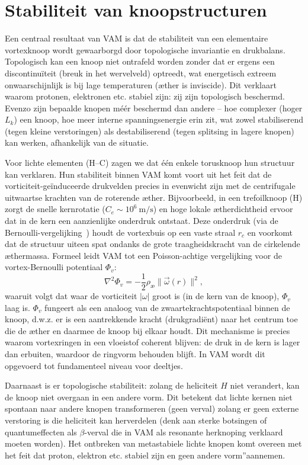 \section{Stabiliteit van knoopstructuren}

Een centraal resultaat van VAM is dat de stabiliteit van een elementaire vortexknoop wordt gewaarborgd door topologische invariantie en drukbalans. Topologisch kan een knoop niet ontrafeld worden zonder dat er ergens een discontinuïteit (breuk in het wervelveld) optreedt, wat energetisch extreem onwaarschijnlijk is bij lage temperaturen (æther is inviscide). Dit verklaart waarom protonen, elektronen etc. stabiel zijn: zij zijn topologisch beschermd. Evenzo zijn bepaalde knopen méér beschermd dan andere – hoe complexer (hoger $L_k$) een knoop, hoe meer interne spanningsenergie erin zit, wat zowel stabiliserend (tegen kleine verstoringen) als destabiliserend (tegen splitsing in lagere knopen) kan werken, afhankelijk van de situatie.

Voor lichte elementen (H–C) zagen we dat één enkele torusknoop hun structuur kan verklaren. Hun stabiliteit binnen VAM komt voort uit het feit dat
de vorticiteit-geïnduceerde drukvelden precies in evenwicht zijn met de centrifugale uitwaartse krachten van de roterende æther. Bijvoorbeeld, in een trefoilknoop (H) zorgt de snelle kernrotatie ($C_e \sim10^6~\text{m/s}$) en hoge lokale ætherdichtheid ervoor dat in de kern een aanzienlijke onderdruk ontstaat. Deze onderdruk (via de Bernoulli-vergelijking~\cite{Ricca1992EnergyHelicity}) houdt de vortexbuis op een vaste straal $r_c$ en voorkomt dat de structuur uiteen spat ondanks de grote traagheidskracht van de cirkelende æthermassa. Formeel leidt VAM tot een Poisson-achtige vergelijking voor de vortex-Bernoulli potentiaal $\Phi_v$:
\begin{equation}
    \nabla^2 \Phi_v = -\frac{1}{2}\rho_\text{\ae} \| \vec{\omega}(r) \|^2,
\end{equation}
waaruit volgt dat waar de vorticiteit $|\omega|$ groot is (in de kern van de knoop), $\Phi_v$ laag is. $\Phi_v$ fungeert als een analoog van de zwaartekrachtspotentiaal binnen de knoop, d.w.z. er is een aantrekkende kracht (drukgradiënt) naar het centrum toe die de æther en daarmee de knoop bij elkaar houdt. Dit mechanisme is precies waarom vortexringen in een vloeistof coherent blijven: de druk in de kern is lager dan erbuiten, waardoor de ringvorm behouden blijft. In VAM wordt dit opgevoerd tot fundamenteel niveau voor deeltjes.

Daarnaast is er topologische stabiliteit: zolang de heliciteit $H$ niet verandert, kan de knoop niet overgaan in een andere vorm. Dit betekent dat lichte kernen niet spontaan naar andere knopen transformeren (geen verval) zolang er geen externe verstoring is die heliciteit kan herverdelen (denk aan sterke botsingen of quantumeffecten als $\beta$-verval die in VAM als resonante herknoping verklaard moeten worden). Het ontbreken van metastabiele lichte knopen komt overeen met het feit dat proton, elektron etc. stabiel zijn en geen \grqq andere vorm\textquotedblright aannemen.